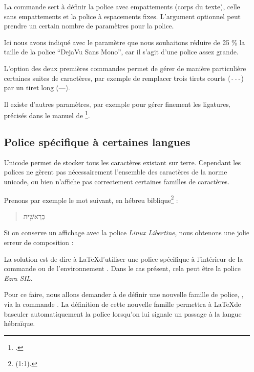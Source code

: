 La commande  sert à définir la police avec empattements (corps du texte),  celle sans empattements et  la police à espacements fixes. L'argument optionnel peut prendre un certain nombre de paramètres pour la police. 

Ici nous avons indiqué avec le paramètre  que nous souhaitons réduire de 25 \% la taille de la police \enquote{DejaVu Sans Mono}, car il s'agit d'une police assez grande. 

L'option  des deux premières commandes permet de gérer de manière particulière certaines suites de caractères, par exemple de remplacer trois tirets courts (\verb|---|) par un tiret long (---). 

Il existe d'autres paramètres, par exemple pour gérer finement les ligatures, précisés dans le manuel de \footcite{fontspec_optionspolices}.

\subsection{Police spécifique à certaines langues}\label{policenonlatine}

Unicode permet de stocker tous les caractères existant sur terre. Cependant les polices ne gèrent pas nécessairement l'ensemble des caractères de la norme unicode, ou bien n'affiche pas correctement certaines familles de caractères. 

Prenons par exemple le mot suivant, en hébreu biblique\footnote{(1:1).} :

\begin{quotation}
\texthebrew{בְּרֵאשִׁ֖ית}
\end{quotation}

Si on conserve un affichage avec la police \emph{Linux Libertine}, nous obtenons une jolie erreur de composition :

\begin{quotation}
\texthebrew{}
\end{quotation}

La solution est de dire à \LaTeX d'utiliser une police spécifique à l'intérieur de la commande  ou de  l'environnement . Dans le cas présent, cela peut être la police \emph{Ezra SIL}.

Pour ce faire, nous allons demander à  de définir une nouvelle famille de police, \csp{\hebrewfont}, via la commande . La définition de cette nouvelle famille permettra à \LaTeX de basculer automatiquement la police lorsqu'on lui signale un passage à la langue hébraïque.

